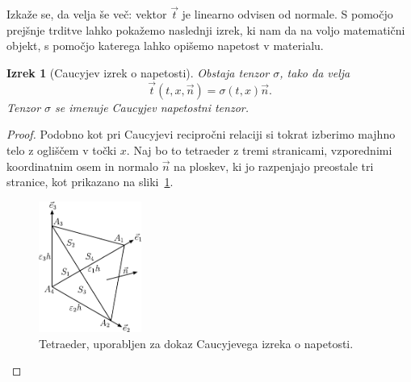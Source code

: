\documentclass[12pt,a4paper,twoside]{article}
\theoremstyle{definition} %
\theoremstyle{plain} %
\newtheorem{izrek}[definicija]{Izrek}
\numberwithin{equation}{section}
\newcommand{\vt}{\vec{t}}
\newcommand{\vn}{\vec{n}}
\newcommand{\vx}{x}
\newcommand{\ts}{\sigma}
\begin{document}
Izkaže se, da velja še več: vektor $\vt$ je linearno odvisen od normale. S
pomočjo prejšnje trditve lahko pokažemo naslednji izrek, ki nam da na voljo
matematični objekt, s pomočjo katerega lahko opišemo napetost v materialu.
\begin{izrek}[Caucyjev izrek o napetosti]
  Obstaja tenzor $\ts$, tako da velja \[
    \vt(t, \vx, \vn) = \ts(t, \vx)\vn.
  \]
  Tenzor $\ts$ se imenuje Caucyjev napetostni tenzor.
\end{izrek}
\begin{proof}
Podobno kot pri Caucyjevi recipročni relaciji si tokrat izberimo majhno telo z ogliščem v točki
$\vx$. Naj bo to tetraeder z tremi stranicami, vzporednimi koordinatnim osem in normalo $\vn$ na
ploskev, ki jo razpenjajo preostale tri stranice, kot prikazano na sliki~\ref{fig:tetra}.

\begin{figure}[h]
  \centering
  \includegraphics[width=0.3\textwidth]{images/cauchy_tetrahedron.pdf}
  \caption{Tetraeder, uporabljen za dokaz Caucyjevega izreka o napetosti.}
  \label{fig:tetra}
\end{figure}


\end{proof}
\end{document}

